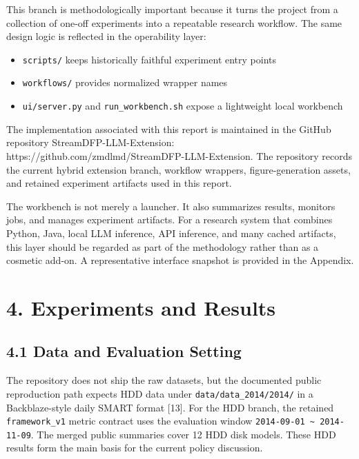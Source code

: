 \documentclass[
  11pt,
  a4paper]{article}
\providecommand{\tightlist}{%
  \setlength{\itemsep}{0pt}\setlength{\parskip}{0pt}}
\begin{document}
This branch is methodologically important because it turns the project
from a collection of one-off experiments into a repeatable research
workflow. The same design logic is reflected in the operability layer:

\begin{itemize}
\tightlist
\item
  \texttt{scripts/} keeps historically faithful experiment entry points
\item
  \texttt{workflows/} provides normalized wrapper names
\item
  \texttt{ui/server.py} and \texttt{run\_workbench.sh} expose a
  lightweight local workbench
\end{itemize}

The implementation associated with this report is maintained in the
GitHub repository StreamDFP-LLM-Extension:
https://github.com/zmdlmd/StreamDFP-LLM-Extension. The repository
records the current hybrid extension branch, workflow wrappers,
figure-generation assets, and retained experiment artifacts used in this
report.

The workbench is not merely a launcher. It also summarizes results,
monitors jobs, and manages experiment artifacts. For a research system
that combines Python, Java, local LLM inference, API inference, and many
cached artifacts, this layer should be regarded as part of the
methodology rather than as a cosmetic add-on. A representative interface
snapshot is provided in the Appendix.

\hypertarget{experiments-and-results}{%
\section{4. Experiments and Results}\label{experiments-and-results}}

\hypertarget{data-and-evaluation-setting}{%
\subsection{4.1 Data and Evaluation
Setting}\label{data-and-evaluation-setting}}

The repository does not ship the raw datasets, but the documented public
reproduction path expects HDD data under \texttt{data/data\_2014/2014/}
in a Backblaze-style daily SMART format {[}13{]}. For the HDD branch,
the retained \texttt{framework\_v1} metric contract uses the evaluation
window \texttt{2014-09-01\ \textasciitilde{}\ 2014-11-09}. The merged
public summaries cover 12 HDD disk models. These HDD results form the
main basis for the current policy discussion.
\end{document}

